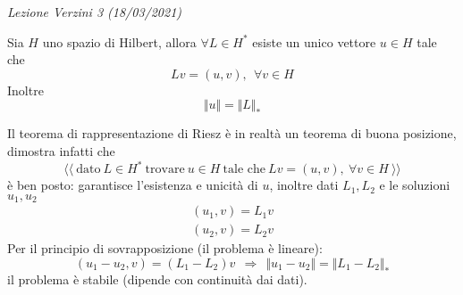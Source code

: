 \documentclass[10pt,a4paper,twoside,openright]{book}
\begin{document}
\textit{Lezione Verzini 3 (18/03/2021)}
\begin{theorem}
 Sia $H$ uno spazio di Hilbert, allora $\forall L\in H^{*}$ esiste un unico vettore $u\in H$ tale che
\begin{equation*}
Lv=(u,v),\ \ \forall v\in H
\end{equation*}
Inoltre
\begin{equation*}
\Vert u\Vert =\Vert L\Vert _{*}
\end{equation*}
\end{theorem}
\begin{oss}
Il teorema di rappresentazione di Riesz è in realtà un teorema di buona posizione, dimostra infatti che
\begin{equation*}
\langle\langle \ \text{dato} \ L\in H^{*} \ \text{trovare} \ u\in H\ \text{tale che} \ Lv=(u,v),\ \forall v\in H\ \rangle\rangle 
\end{equation*}
è ben posto: garantisce l'esistenza e unicità di $\displaystyle u$, inoltre dati $\displaystyle L_{1},L_{2}$ e le soluzioni $\displaystyle u_{1},u_{2}$
\begin{gather*}
(u_{1},v) =L_{1} v\\
(u_{2},v) =L_{2} v
\end{gather*}
Per il principio di sovrapposizione (il problema è lineare):
\begin{equation*}
(u_{1} -u_{2},v) =(L_{1} -L_{2}) v\ \ \Rightarrow \ \ \Vert u_{1} -u_{2}\Vert =\Vert L_{1} -L_{2}\Vert _{*}
\end{equation*}
il problema è stabile (dipende con continuità dai dati).
\end{oss}
\end{document}
